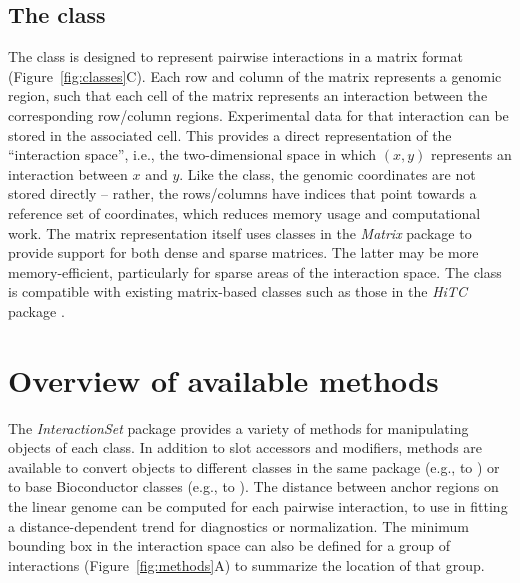 \documentclass[10pt,a4paper,twocolumn]{article}
\begin{document}
\subsection*{The  class}
The  class is designed to represent pairwise interactions in a matrix format (Figure~\ref{fig:classes}C).
Each row and column of the matrix represents a genomic region, such that each cell of the matrix represents an interaction between the corresponding row/column regions.
Experimental data for that interaction can be stored in the associated cell.
This provides a direct representation of the ``interaction space'', i.e., the two-dimensional space in which $(x, y)$ represents an interaction between $x$ and $y$.
Like the  class, the genomic coordinates are not stored directly -- rather, the rows/columns have indices that point towards a reference set of coordinates, which reduces memory usage and computational work.
The matrix representation itself uses classes in the \textit{Matrix} package to provide support for both dense and sparse matrices.
The latter may be more memory-efficient, particularly for sparse areas of the interaction space.
The  class is compatible with existing matrix-based classes such as those in the \textit{HiTC} package \cite{servant2012hitc}.

\section*{Overview of available methods}
The \textit{InteractionSet} package provides a variety of methods for manipulating objects of each class.
In addition to slot accessors and modifiers, methods are available to convert objects to different classes in the same package (e.g.,  to ) or to base Bioconductor classes (e.g.,  to ).
The distance between anchor regions on the linear genome can be computed for each pairwise interaction, to use in fitting a distance-dependent trend \cite{aiden2009comprehensive} for diagnostics or normalization.
The minimum bounding box in the interaction space can also be defined for a group of interactions (Figure~\ref{fig:methods}A) to summarize the location of that group.
\end{document}
